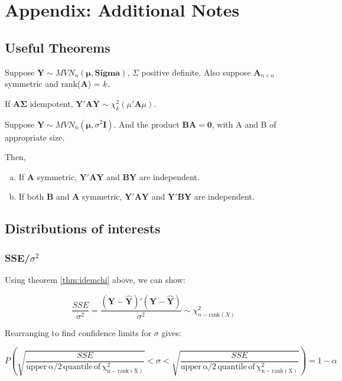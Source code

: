 \documentclass[11pt]{article}
\begin{document}
{\newpage
\section{Appendix: Additional Notes}
\label{sec-4}
\subsection{Useful Theorems}
\label{sec-4-1}


\begin{theorem}
\label{thm:idemchi}
Suppose $\mathbf{Y} \sim MVN_n(\mathbf{\mu}, \mathbf{Sigma})$, $\Sigma$ positive definite. 
Also suppose $\mathbf{A}_{n \times n}$ symmetric and rank($\mathbf{A}$) = $k$.

If $\mathbf{A\Sigma}$ idempotent, $\mathbf{Y'AY} \sim \chi^2_k (\mu'\mathbf{A}\mu)$.

\end{theorem}

\begin{theorem}
Suppose $\mathbf{Y} \sim MVN_n(\mathbf{\mu}, \sigma^2\mathbf{I})$. And the product $\mathbf{BA}=\mathbf{0}$, with A and B of appropriate size.

Then,

\begin{enumerate}[(a)]
\item If $\mathbf{A}$ symmetric, $\mathbf{Y'AY}$ and $\mathbf{BY}$ are independent.
\item If both $\mathbf{B}$ and $\mathbf{A}$ symmetric, $\mathbf{Y'AY}$ and $\mathbf{Y'BY}$ are independent.
\end{enumerate}

\end{theorem}
\subsection{Distributions of interests}
\label{sec-4-2}
\subsubsection{SSE/$\sigma$$^2$}
\label{sec-4-2-1}


Using theorem \ref{thm:idemchi} above, we can show:

$$\frac{SSE}{\sigma^2} = \frac{(\mathbf{Y} -
\hat{\mathbf{Y}})'(\mathbf{Y} - \hat{\mathbf{Y}})}{\sigma^2} \sim
\chi^2_{n-\text{rank}(X)}$$

Rearranging to find confidence limits for $\sigma$ gives:

$$P\left(\sqrt{\frac{SSE}{\mathrm{upper\, \alpha/2\, quantile\, of\,
\chi^2_{n-\mathrm{rank}(X)}}}} < \sigma < \sqrt{\frac{SSE}{\mathrm{upper\, \alpha/2\, quantile\, of\, \chi^2_{n-\mathrm{rank}(X)}}}} \right)
= 1 - \alpha$$
}
\end{document}

